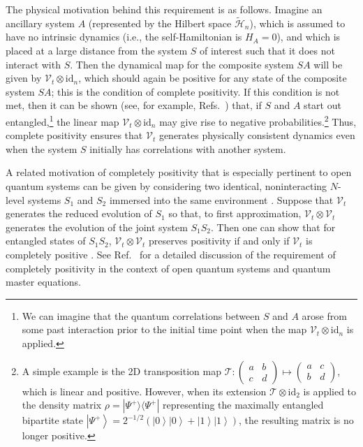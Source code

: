 \documentclass[3p,sort&compress]{elsarticle}
\newcommand{\ket}[1]{\left\vert{#1}\right\rangle}
\newcommand{\ketbra}[2]{\ensuremath{|{#1 \rangle}{\langle #2}|}}
\newcommand{\op}[1]{#1}
\begin{document}
\begin{enumerate}
The physical motivation behind this requirement is as follows. Imagine an ancillary system $A$ (represented by the Hilbert space $\tilde{\mathcal{H}}_n$), which is assumed to have no intrinsic dynamics (i.e., the self-Hamiltonian is $H_A=0$), and which is placed at a large distance from the system $S$ of interest such that it does not interact with $S$. Then the dynamical map for the composite system $SA$ will be given by $\mathcal{V}_t \otimes \text{id}_n$, which should again be positive for any state of the composite system $SA$; this is the condition of complete positivity. If this condition is not met, then it can be shown (see, for example, Refs.~\cite{Horodecki:1995:oo,Peres:1996:oo,Alicki:2001:aa,Benatti:2005:ii}) that, if $S$ and $A$ start out entangled,\footnote{We can imagine that the quantum correlations between $S$ and $A$ arose from some past interaction prior to the initial time point when the map  $\mathcal{V}_t \otimes \text{id}_n$ is applied.} the linear map $\mathcal{V}_t \otimes \text{id}_n$ may give rise to negative probabilities.\footnote{A simple example is the 2D transposition map $\mathcal{T} : \left(\begin{smallmatrix}a&b\\c&d\end{smallmatrix}\right) \mapsto \left(\begin{smallmatrix}a&c\\b&d\end{smallmatrix}\right)$, which is linear and positive. However, when its extension $\mathcal{T}\otimes\text{id}_2$ is applied to the density matrix $\op{\rho}=\ketbra{\Psi^+}{\Psi^+}$ representing the maximally entangled bipartite state $\ket{\Psi^+}=2^{-1/2}\left(\ket{0}\ket{0}+\ket{1}\ket{1}\right)$, the resulting matrix is no longer positive.} Thus, complete positivity ensures that $\mathcal{V}_t$ generates physically consistent dynamics even when the system $S$ initially has correlations with another system. 

A related motivation of completely positivity that is especially pertinent to open quantum systems can be given by considering two identical, noninteracting $N$-level systems $S_1$ and $S_2$ immersed into the same environment \cite{Benatti:2002:oo,Benatti:2005:ii}. Suppose that $\mathcal{V}_t$ generates the reduced evolution of $S_1$ so that, to first approximation, $\mathcal{V}_t\otimes \mathcal{V}_t$ generates the evolution of the joint system $S_1S_2$. Then one can show that for entangled states of $S_1S_2$, $\mathcal{V}_t\otimes \mathcal{V}_t$ preserves positivity if and only if $\mathcal{V}_t$ is completely positive \cite{Benatti:2002:oo}. See Ref.~\cite{Benatti:2005:ii} for a detailed discussion of the requirement of completely positivity in the context of open quantum systems and quantum master equations.


\end{enumerate}
\end{document}

